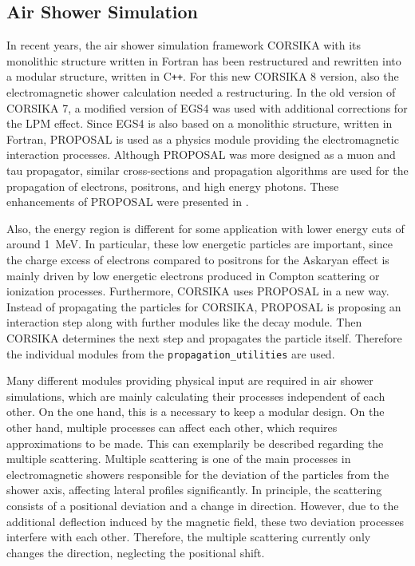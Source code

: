 %

\subsection{Air Shower Simulation} \label{sec:corsika}

In recent years, the air shower simulation framework CORSIKA \cite{CORSIKA, Engel19} with its monolithic structure written in Fortran has been restructured and rewritten into a modular structure, written in C\texttt{++}.
For this new CORSIKA 8 version, also the electromagnetic shower calculation needed a restructuring.
In the old version of CORSIKA 7, a modified version of EGS4 \cite{Bielajew94EGS4, Nelson94EGS4, EGS5} was used with additional corrections for the LPM effect.
Since EGS4 is also based on a monolithic structure, written in Fortran, PROPOSAL is used as a physics module providing the electromagnetic interaction processes.
Although PROPOSAL was more designed as a muon and tau propagator, similar cross-sections and propagation algorithms are used for the propagation of electrons, positrons, and high energy photons.
These enhancements of PROPOSAL were presented in \cite{Alameddine20PROPOSAL}.

Also, the energy region is different for some application with lower energy cuts of around \SI{1}{MeV}.
In particular, these low energetic particles are important, since the charge excess of electrons compared to positrons for the Askaryan effect is mainly driven by low energetic electrons produced in Compton scattering or ionization processes.
Furthermore, CORSIKA uses PROPOSAL in a new way.
Instead of propagating the particles for CORSIKA, PROPOSAL is proposing an interaction step along with further modules like the decay module.
Then CORSIKA determines the next step and propagates the particle itself.
Therefore the individual modules from the \texttt{propagation\_utilities} are used.

Many different modules providing physical input are required in air shower simulations, which are mainly calculating their processes independent of each other.
On the one hand, this is a necessary to keep a modular design.
On the other hand, multiple processes can affect each other, which requires approximations to be made.
This can exemplarily be described regarding the multiple scattering.
Multiple scattering is one of the main processes in electromagnetic showers responsible for the deviation of the particles from the shower axis, affecting lateral profiles significantly.
In principle, the scattering consists of a positional deviation and a change in direction.
However, due to the additional deflection induced by the magnetic field, these two deviation processes interfere with each other.
Therefore, the multiple scattering currently only changes the direction, neglecting the positional shift.

